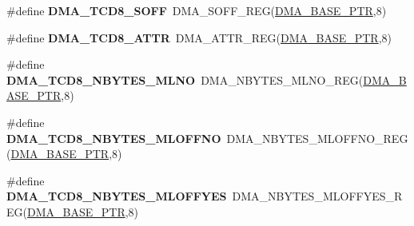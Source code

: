 \begin{DoxyCompactItemize}
\item 
\hypertarget{group___d_m_a___register___accessor___macros_gab1105a5f653de713708697e108fa31fd}{}\#define {\bfseries D\+M\+A\+\_\+\+T\+C\+D8\+\_\+\+S\+O\+F\+F}~D\+M\+A\+\_\+\+S\+O\+F\+F\+\_\+\+R\+E\+G(\hyperlink{group___d_m_a___peripheral_ga6997fbc1b1973e9f27170217a3bd6f22}{D\+M\+A\+\_\+\+B\+A\+S\+E\+\_\+\+P\+T\+R},8)\label{group___d_m_a___register___accessor___macros_gab1105a5f653de713708697e108fa31fd}

\item 
\hypertarget{group___d_m_a___register___accessor___macros_ga13699886fa956fad85a58d6e9caa8692}{}\#define {\bfseries D\+M\+A\+\_\+\+T\+C\+D8\+\_\+\+A\+T\+T\+R}~D\+M\+A\+\_\+\+A\+T\+T\+R\+\_\+\+R\+E\+G(\hyperlink{group___d_m_a___peripheral_ga6997fbc1b1973e9f27170217a3bd6f22}{D\+M\+A\+\_\+\+B\+A\+S\+E\+\_\+\+P\+T\+R},8)\label{group___d_m_a___register___accessor___macros_ga13699886fa956fad85a58d6e9caa8692}

\item 
\hypertarget{group___d_m_a___register___accessor___macros_gaf790a6c71e0fbfc98f7c7edea11862e7}{}\#define {\bfseries D\+M\+A\+\_\+\+T\+C\+D8\+\_\+\+N\+B\+Y\+T\+E\+S\+\_\+\+M\+L\+N\+O}~D\+M\+A\+\_\+\+N\+B\+Y\+T\+E\+S\+\_\+\+M\+L\+N\+O\+\_\+\+R\+E\+G(\hyperlink{group___d_m_a___peripheral_ga6997fbc1b1973e9f27170217a3bd6f22}{D\+M\+A\+\_\+\+B\+A\+S\+E\+\_\+\+P\+T\+R},8)\label{group___d_m_a___register___accessor___macros_gaf790a6c71e0fbfc98f7c7edea11862e7}

\item 
\hypertarget{group___d_m_a___register___accessor___macros_gae2ff09bfa732b7e37ba88433b2a69e39}{}\#define {\bfseries D\+M\+A\+\_\+\+T\+C\+D8\+\_\+\+N\+B\+Y\+T\+E\+S\+\_\+\+M\+L\+O\+F\+F\+N\+O}~D\+M\+A\+\_\+\+N\+B\+Y\+T\+E\+S\+\_\+\+M\+L\+O\+F\+F\+N\+O\+\_\+\+R\+E\+G(\hyperlink{group___d_m_a___peripheral_ga6997fbc1b1973e9f27170217a3bd6f22}{D\+M\+A\+\_\+\+B\+A\+S\+E\+\_\+\+P\+T\+R},8)\label{group___d_m_a___register___accessor___macros_gae2ff09bfa732b7e37ba88433b2a69e39}

\item 
\hypertarget{group___d_m_a___register___accessor___macros_ga16dfd53221d052e7931b716d37783ecc}{}\#define {\bfseries D\+M\+A\+\_\+\+T\+C\+D8\+\_\+\+N\+B\+Y\+T\+E\+S\+\_\+\+M\+L\+O\+F\+F\+Y\+E\+S}~D\+M\+A\+\_\+\+N\+B\+Y\+T\+E\+S\+\_\+\+M\+L\+O\+F\+F\+Y\+E\+S\+\_\+\+R\+E\+G(\hyperlink{group___d_m_a___peripheral_ga6997fbc1b1973e9f27170217a3bd6f22}{D\+M\+A\+\_\+\+B\+A\+S\+E\+\_\+\+P\+T\+R},8)\label{group___d_m_a___register___accessor___macros_ga16dfd53221d052e7931b716d37783ecc}


\end{DoxyCompactItemize}
